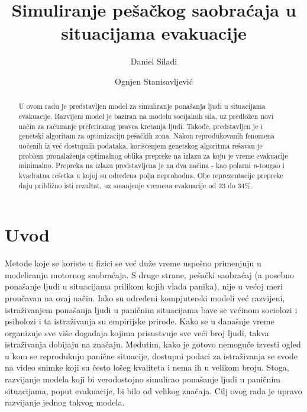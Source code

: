 \documentclass[12pt]{article}
\begin{document}
\title{\textbf{Simuliranje pešačkog saobraćaja u situacijama evakuacije}}

\author{
Daniel Silađi\\
\and
Ognjen Stanisavljević
}

\date{} %
\maketitle %


\begin{abstract}
U ovom radu je predstavljen model za simuliranje ponašanja ljudi u situacijama evakuacije. Razvijeni model je baziran na modelu socijalnih sila, uz predložen novi način za računanje preferiranog pravca kretanja ljudi. Takođe, predstavljen je i genetski algoritam za optimizaciju pešačkih zona. Nakon reprodukovanih fenomena uočenih iz već dostupnih podataka, korišćenjem genetskog algoritma rešavan je problem pronalaženja optimalnog oblika prepreke na izlazu za koju je vreme evakuacije minimalno. Prepreka na izlazu predstavljena je na dva načina - kao polarni \emph{n}-tougao i kvadratna rešetka u kojoj su određena polja neprohodna. Obe reprezentacije prepreke daju približno isti rezultat, uz smanjenje vremena evakuacije od 23 do 34\%. 
\end{abstract}


\section{Uvod}

Metode koje se koriste u fizici se već duže vreme uspešno primenjuju u  modeliranju motornog saobraćaja. S druge strane, pešački saobraćaj (a posebno ponašanje ljudi u situacijama prilikom kojih vlada panika), nije u većoj meri proučavan na ovaj način. Iako su određeni kompjuterski modeli već razvijeni, istraživanjem ponašanja ljudi u paničnim situacijama bave  se većinom sociolozi i psiholozi i ta istraživanja su empirijske prirode. Kako se u današnje vreme organizuje sve više događaja kojima prisustvuje sve veći broj ljudi, takva istraživanja dobijaju na značaju. Međutim, kako je gotovo nemoguće izvesti ogled u kom se reprodukuju panične situacije, dostupni podaci za istraživanja se svode na video snimke koji su često lošeg kvaliteta i nema ih u velikom broju. Stoga, razvijanje modela koji bi verodostojno simulirao ponašanje ljudi u paničnim situacijama, poput evakuacije, bi bilo od velikog značaja. Cilj ovog rada je upravo razvijanje jednog takvog modela.
\end{document}
